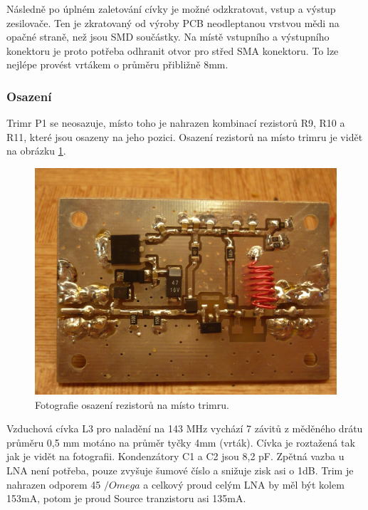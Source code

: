 \documentclass[12pt,a4paper,oneside]{article}
\begin{document}
Následně po úplném zaletování cívky je možné odzkratovat, vstup a výstup zesilovače. Ten je zkratovaný od výroby PCB neodleptanou vrstvou mědi na opačné straně, než jsou SMD součástky. Na místě vstupního a výstupního konektoru je proto potřeba odhranit otvor pro střed SMA konektoru. To lze nejlépe provést vrtákem o průměru přibližně 8mm. 

\subsubsection{Osazení}

Trimr P1 se neosazuje, místo toho je nahrazen kombinací rezistorů R9, R10 a R11, které jsou osazeny na jeho pozici. Osazení rezistorů na místo trimru je vidět na obrázku \ref{osazeni}.


\begin{figure} [htbp]
\begin{center}
\includegraphics [width=130mm] {../img/LNA01A_bottom_big.jpg}
\caption{Fotografie osazení rezistorů na místo trimru.}
\label{osazeni}
\end{center}
\end{figure}


Vzduchová cívka L3 pro naladění na 143 MHz vychází 7 závitů z měděného drátu průměru 0,5 mm motáno na průměr tyčky 4mm (vrták). Cívka je roztažená tak jak je vidět na fotografii. Kondenzátory C1 a C2 jsou 8,2 pF. Zpětná vazba u LNA není potřeba, pouze zvyšuje šumové číslo a snižuje zisk asi o 1dB. Trim je nahrazen odporem 45 $/Omega$ a celkový proud celým LNA by měl být kolem 153mA, potom je proud Source tranzistoru asi 135mA. 
\end{document}
